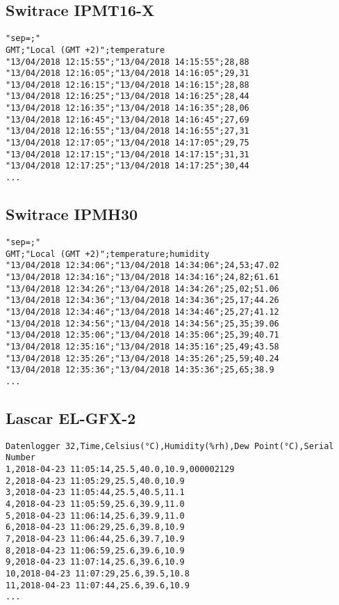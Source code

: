 \subsection*{Switrace IPMT16-X}
\begin{lstlisting}[language={},inputencoding={utf8}]
"sep=;"
GMT;"Local (GMT +2)";temperature
"13/04/2018 12:15:55";"13/04/2018 14:15:55";28,88
"13/04/2018 12:16:05";"13/04/2018 14:16:05";29,31
"13/04/2018 12:16:15";"13/04/2018 14:16:15";28,88
"13/04/2018 12:16:25";"13/04/2018 14:16:25";28,44
"13/04/2018 12:16:35";"13/04/2018 14:16:35";28,06
"13/04/2018 12:16:45";"13/04/2018 14:16:45";27,69
"13/04/2018 12:16:55";"13/04/2018 14:16:55";27,31
"13/04/2018 12:17:05";"13/04/2018 14:17:05";29,75
"13/04/2018 12:17:15";"13/04/2018 14:17:15";31,31
"13/04/2018 12:17:25";"13/04/2018 14:17:25";30,44
...
\end{lstlisting}


\subsection*{Switrace IPMH30}
\begin{lstlisting}[language={},inputencoding={utf8}]
"sep=;"
GMT;"Local (GMT +2)";temperature;humidity
"13/04/2018 12:34:06";"13/04/2018 14:34:06";24,53;47.02
"13/04/2018 12:34:16";"13/04/2018 14:34:16";24,82;61.61
"13/04/2018 12:34:26";"13/04/2018 14:34:26";25,02;51.06
"13/04/2018 12:34:36";"13/04/2018 14:34:36";25,17;44.26
"13/04/2018 12:34:46";"13/04/2018 14:34:46";25,27;41.12
"13/04/2018 12:34:56";"13/04/2018 14:34:56";25,35;39.06
"13/04/2018 12:35:06";"13/04/2018 14:35:06";25,39;40.71
"13/04/2018 12:35:16";"13/04/2018 14:35:16";25,49;43.58
"13/04/2018 12:35:26";"13/04/2018 14:35:26";25,59;40.24
"13/04/2018 12:35:36";"13/04/2018 14:35:36";25,65;38.9
...
\end{lstlisting}

\pagebreak
\subsection*{Lascar EL-GFX-2}
\begin{lstlisting}[language={},inputencoding={utf8}]
Datenlogger 32,Time,Celsius(°C),Humidity(%rh),Dew Point(°C),Serial Number
1,2018-04-23 11:05:14,25.5,40.0,10.9,000002129
2,2018-04-23 11:05:29,25.5,40.0,10.9
3,2018-04-23 11:05:44,25.5,40.5,11.1
4,2018-04-23 11:05:59,25.6,39.9,11.0
5,2018-04-23 11:06:14,25.6,39.9,11.0
6,2018-04-23 11:06:29,25.6,39.8,10.9
7,2018-04-23 11:06:44,25.6,39.7,10.9
8,2018-04-23 11:06:59,25.6,39.6,10.9
9,2018-04-23 11:07:14,25.6,39.6,10.9
10,2018-04-23 11:07:29,25.6,39.5,10.8
11,2018-04-23 11:07:44,25.6,39.6,10.9
...
\end{lstlisting}


